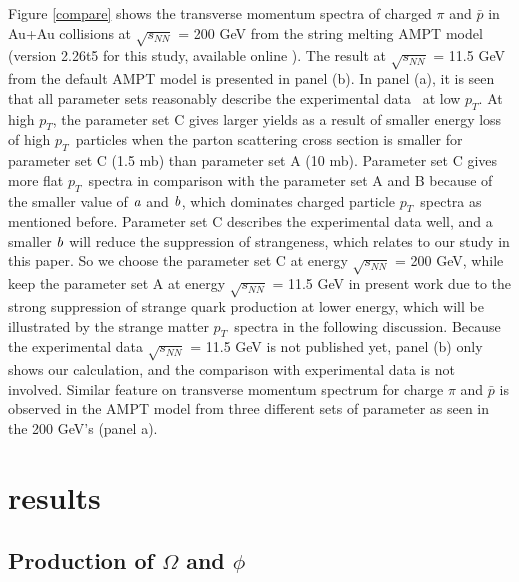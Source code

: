 \documentclass[twocolumn,aps,prc,showpacs,superscriptaddress,preprintnumbers,floatfix,nofootinbib]{revtex4}
\newcommand{ \pt } {${p_{T}}$}
\begin{document}
\begin{CJK*}{GBK}{song}
Figure \ref{compare} shows the transverse momentum  spectra of charged $\pi$ and $\bar{p}$ in Au+Au collisions at $\sqrt{s_{NN}}$ = 200 GeV from the string melting AMPT model (version 2.26t5 for this study, available online \cite{AMPT-Web}). The result at $\sqrt{s_{NN}}$ = 11.5 GeV from the default AMPT model is presented in panel (b). In panel (a), it is seen that all parameter sets reasonably describe the experimental data~\cite{star_compare} at low \pt. At high \pt, the parameter set C gives larger yields as a result of smaller energy loss of high \pt ~particles when the parton scattering cross section is smaller for parameter set C (1.5 mb) than parameter set A (10 mb). Parameter set C gives more flat \pt ~spectra in comparison with the parameter set A and B because of the smaller value of $\it a$ and $\it b$, which dominates charged particle \pt ~spectra as mentioned before. Parameter set C describes the experimental data well, and a smaller $\it b$ will reduce the suppression of strangeness, which relates to our study in this paper. So we choose the parameter set C at energy $\sqrt{s_{NN}}$ = 200 GeV, while keep the parameter set A at energy $\sqrt{s_{NN}}$ = 11.5 GeV in present work due to the strong suppression of strange quark production at lower energy, which will be illustrated by the strange matter \pt~spectra in the following discussion. Because the experimental data $\sqrt{s_{NN}}$ = 11.5 GeV is not published yet, panel (b) only shows our calculation, and the comparison with experimental data is not involved. Similar feature on transverse momentum spectrum for charge $\pi$ and $\bar{p}$ is observed in the AMPT model from three different sets of parameter as seen in the 200 GeV's (panel a).


\section{results}

\subsection{Production of $\Omega$ and $\phi$}


\end{CJK*}
\end{document}
